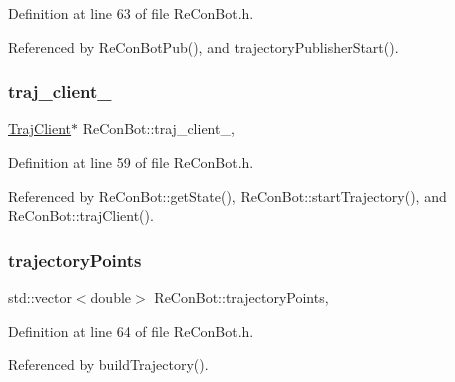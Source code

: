 Definition at line 63 of file Re\+Con\+Bot.\+h.



Referenced by Re\+Con\+Bot\+Pub(), and trajectory\+Publisher\+Start().

\mbox{\label{class_re_con_bot_a14a35ad6ca284af7db7228d7872720d1}} 
\subsubsection{\texorpdfstring{traj\+\_\+client\+\_\+}{traj\_client\_}}
{\footnotesize\ttfamily \hyperlink{basic__arm_8cpp_a6fb8875093261cdc69e54d3ac7d5c301}{Traj\+Client}$\ast$ Re\+Con\+Bot\+::traj\+\_\+client\+\_\+\hspace{0.3cm}{\ttfamily [protected]}, {\ttfamily [inherited]}}



Definition at line 59 of file Re\+Con\+Bot.\+h.



Referenced by Re\+Con\+Bot\+::get\+State(), Re\+Con\+Bot\+::start\+Trajectory(), and Re\+Con\+Bot\+::traj\+Client().

\mbox{\label{class_re_con_bot_a7c59e136741800bf0734f659119aa5ee}} 
\subsubsection{\texorpdfstring{trajectory\+Points}{trajectoryPoints}}
{\footnotesize\ttfamily std\+::vector$<$double$>$ Re\+Con\+Bot\+::trajectory\+Points\hspace{0.3cm}{\ttfamily [protected]}, {\ttfamily [inherited]}}



Definition at line 64 of file Re\+Con\+Bot.\+h.



Referenced by build\+Trajectory().

\mbox{\label{class_re_con_bot_pub_ac2d5ba45905a24cfbdd78bce2dfe2a4f}} 

